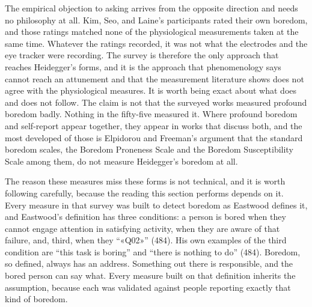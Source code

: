 The empirical objection to asking arrives from the opposite direction and needs no philosophy
at all. Kim, Seo, and Laine's participants rated their own boredom, and those ratings matched
none of the physiological measurements taken at the same time. Whatever the ratings recorded,
it was not what the electrodes and the eye tracker were recording. The survey is therefore the
only approach that reaches Heidegger's forms, and it is the approach that phenomenology says
cannot reach an attunement and that the measurement literature shows does not agree with the
physiological measures. It is worth being exact about what does and does not follow. The claim
is not that the surveyed works measured profound boredom badly. Nothing in the fifty-five
measured it. Where profound boredom and self-report appear together, they appear in works that
discuss both, and the most developed of those is Elpidorou and Freeman's argument that the
standard boredom scales, the Boredom Proneness Scale and the Boredom Susceptibility Scale among
them, do not measure Heidegger's boredom at all.

The reason these measures miss these forms is not technical, and it is worth following
carefully, because the reading this section performs depends on it. Every measure in that
survey was built to detect boredom as Eastwood defines it, and Eastwood's definition has three
conditions: a person is bored when they cannot engage attention in satisfying activity, when
they are aware of that failure, and, third, when they ``«Q02»'' (484). His own examples of the
third condition are ``this task is boring'' and ``there is nothing to do'' (484). Boredom, so
defined, always has an address. Something out there is responsible, and the bored person can
say what. Every measure built on that definition inherits the assumption, because each was
validated against people reporting exactly that kind of boredom.

